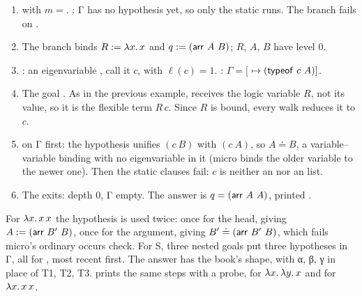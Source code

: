 \begin{tutorial}
\begin{enumerate}
  \item {} with $m={}$. : Γ has no hypothesis
    yet, so only the static  runs. The  branch fails on .
  \item The  branch binds $R:=\lambda x.\,x$ and $q:=(\mathsf{arr}\ A\ B)$; $R$, $A$, $B$ have
    level 0.
  \item {}: an eigenvariable , call it $c$, with $\ell(c)=1$.
    : $\Gamma=[$${}\mapsto(\mathsf{typeof}\ c\ A)]$.
  \item The goal . As in the previous example,  receives the
    logic variable $R$, not its value, so it is the flexible term $R\,c$. Since $R$ is bound, every
    walk reduces it to $c$.
  \item {} on Γ first: the hypothesis unifies $(c\ B)$ with $(c\ A)$, so
    $A\doteq B$, a variable--variable binding with no eigenvariable in it (micro binds the older
    variable to the newer one). Then the static clauses fail: $c$ is neither
    an  nor an  list.
  \item The  exits: depth 0, Γ empty. The answer is $q=(\mathsf{arr}\ A\ A)$, printed
    .
\end{enumerate}
For $\lambda x.\,x\,x$ the hypothesis is used twice: once for the head, giving $A:=(\mathsf{arr}\ B'\ B)$,
once for the argument, giving $B'\doteq(\cst{arr}\ B'\ B)$, which fails micro's ordinary occurs check.
For S, three nested  goals put three hypotheses in Γ, all for , most recent first. The
answer has the book's shape, with α, β, γ in place of T1, T2, T3.  prints the
same steps with a probe, for $\lambda x.\,\lambda y.\,x$ and for $\lambda x.\,x\,x$.
\end{tutorial}

